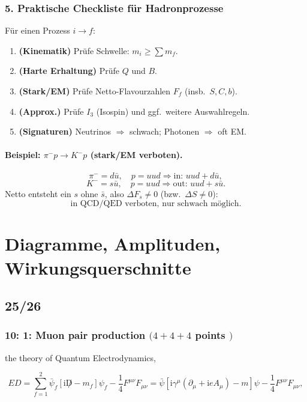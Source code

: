 \documentclass[10pt, letterpaper]{article}
\begin{document}
\subsubsection*{5. Praktische Checkliste für Hadronprozesse}

Für einen Prozess $i\to f$:

\begin{enumerate}
\item \textbf{(Kinematik)} Prüfe Schwelle: $m_i \ge \sum m_f$.
\item \textbf{(Harte Erhaltung)} Prüfe $Q$ und $B$.
\item \textbf{(Stark/EM)} Prüfe Netto-Flavourzahlen $F_f$ (insb.\ $S,C,b$).
\item \textbf{(Approx.)} Prüfe $I_3$ (Isospin) und ggf.\ weitere Auswahlregeln.
\item \textbf{(Signaturen)} Neutrinos $\Rightarrow$ schwach; Photonen $\Rightarrow$ oft EM.
\end{enumerate}

\paragraph{Beispiel: $\pi^-p\to K^-p$ (stark/EM verboten).}
\[
\pi^-=d\bar u,\quad p=uud \Rightarrow \text{in: } uud + d\bar u,
\]
\[
K^-=s\bar u,\quad p=uud \Rightarrow \text{out: } uud + s\bar u.
\]
Netto entsteht ein $s$ ohne $\bar s$, also $\Delta F_s\neq 0$ (bzw.\ $\Delta S\neq 0$):
\[
\boxed{\text{in QCD/QED verboten, nur schwach möglich.}}
\]



\pagebreak


\section{Diagramme, Amplituden, Wirkungsquerschnitte}

\subsection{25/26}


\subsubsection{10: 1: Muon pair production $(4+4+4$ points $)$}
the theory of Quantum Electrodynamics,

$$
E D=\sum_{f=1}^2 \bar{\psi}_f\left[\mathrm{i} \not D-m_f\right] \psi_f-\frac{1}{4} F^{\mu \nu} F_{\mu \nu}=\bar{\psi}\left[\mathrm{i} \gamma^\mu\left(\partial_\mu+\mathrm{i} e A_\mu\right)-m\right] \psi-\frac{1}{4} F^{\mu \nu} F_{\mu \nu},
$$
\end{document}
